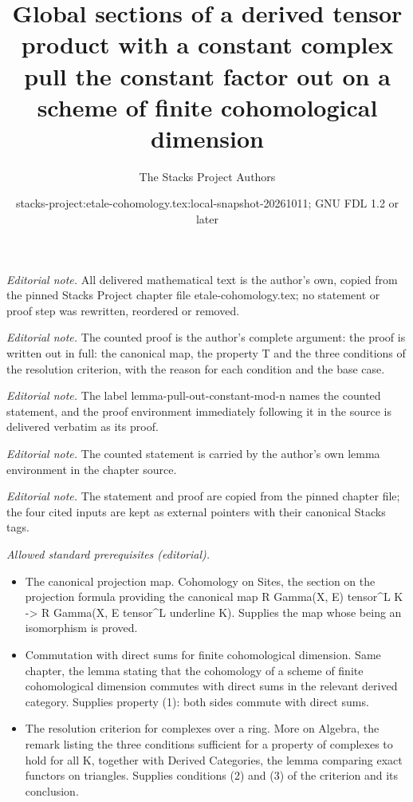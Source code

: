 \documentclass[10pt,a4paper]{amsart}
\title{Global sections of a derived tensor product with a constant complex pull the constant factor out on a scheme of finite cohomological dimension}
\author{The Stacks Project Authors}
\date{stacks-project:etale-cohomology.tex:local-snapshot-20261011; GNU FDL 1.2 or later}
\theoremstyle{plain}
\theoremstyle{definition}
\theoremstyle{remark}
\numberwithin{equation}{subsection}
\begin{document}
\maketitle
\noindent\textit{Editorial note.} All delivered mathematical text is the author's own, copied from the pinned Stacks Project chapter file etale-cohomology.tex; no statement or proof step was rewritten, reordered or removed.\par\medskip
\noindent\textit{Editorial note.} The counted proof is the author's complete argument: the proof is written out in full: the canonical map, the property T and the three conditions of the resolution criterion, with the reason for each condition and the base case.\par\medskip
\noindent\textit{Editorial note.} The label lemma-pull-out-constant-mod-n names the counted statement, and the proof environment immediately following it in the source is delivered verbatim as its proof.\par\medskip
\noindent\textit{Editorial note.} The counted statement is carried by the author's own lemma environment in the chapter source.\par\medskip
\noindent\textit{Editorial note.} The statement and proof are copied from the pinned chapter file; the four cited inputs are kept as external pointers with their canonical Stacks tags.\par\medskip
\noindent\textit{Allowed standard prerequisites (editorial).}\begin{itemize}
\item The canonical projection map. Cohomology on Sites, the section on the projection formula providing the canonical map R Gamma(X, E) tensor\textasciicircum{}L K -> R Gamma(X, E tensor\textasciicircum{}L underline K). Supplies the map whose being an isomorphism is proved.
\item Commutation with direct sums for finite cohomological dimension. Same chapter, the lemma stating that the cohomology of a scheme of finite cohomological dimension commutes with direct sums in the relevant derived category. Supplies property (1): both sides commute with direct sums.
\item The resolution criterion for complexes over a ring. More on Algebra, the remark listing the three conditions sufficient for a property of complexes to hold for all K, together with Derived Categories, the lemma comparing exact functors on triangles. Supplies conditions (2) and (3) of the criterion and its conclusion.
\end{itemize}\medskip
\end{document}
